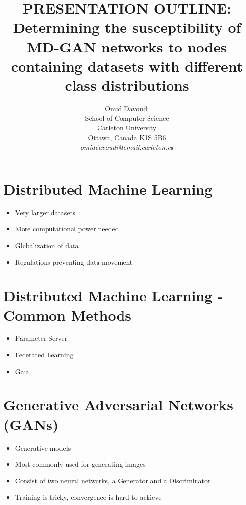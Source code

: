 \documentclass[11pt]{article}       %
\newenvironment{slide}[1]        {\section{#1} \begin{itemize}}%
                                 {\end{itemize}}
\begin{document}


\title{PRESENTATION OUTLINE: Determining the susceptibility of MD-GAN networks to nodes containing datasets with different class distributions}


\author{
Omid Davoudi\\
School of Computer Science\\
Carleton University\\
Ottawa, Canada K1S 5B6\\
{\em omiddavoudi@cmail.carleton.ca}
} %

\maketitle

\begin{slide}{Distributed Machine Learning}
\item Very larger datasets
\item More computational power needed
\item Globalization of data
\item Regulations preventing data movement
\end{slide}

\begin{slide}{Distributed Machine Learning - Common Methods}
\item Parameter Server
\item Federated Learning
\item Gaia
\end{slide}

\begin{slide}{Generative Adversarial Networks (GANs)}
\item Generative models
\item Most commonly used for generating images
\item Consist of two neural networks, a Generator and a Discriminator
\item Training is tricky, convergence is hard to achieve
\end{slide}
\end{document}
